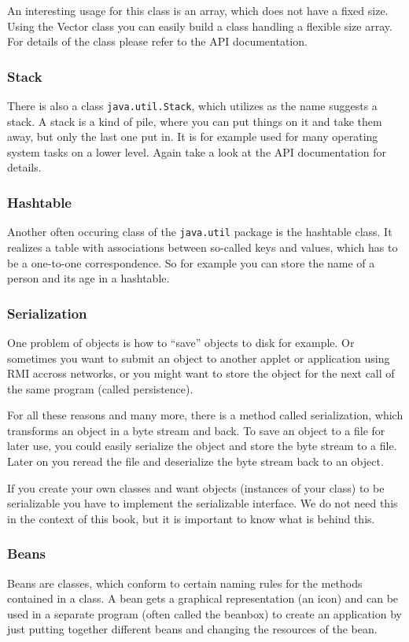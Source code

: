 An interesting usage for this class is an array, which does not have
a fixed size. Using the Vector class you can easily build a class
handling a flexible size array. For details of the class please
refer to the API documentation.

\subsubsection{Stack}
There is also a class \verb|java.util.Stack|, which utilizes as the
name suggests a stack. A stack is a kind of pile, where you can put
things on it and take them away, but only the last one put in. It is
for example used for many operating system tasks on a lower level.
Again take a look at the API documentation for details.

\subsubsection{Hashtable}
Another often occuring class of the \verb|java.util| package is the
hashtable class. It realizes a table with associations between so-called
keys and values, which has to be a one-to-one correspondence. So for
example you can store the name of a person and its age in a hashtable.


\subsubsection{Serialization}
One problem of objects is how to ``save'' objects to disk for example.
Or sometimes you want to submit an object to another applet or
application using RMI accross networks, or you might want to
store the object for the next call of the same program (called 
persistence). 

For all
these reasons and many more, there is a method called serialization,
which transforms an object in a byte stream and back. 
To save an object to a file for later use, you could easily serialize
the object and store the byte stream to a file. Later on you reread
the file and deserialize the byte stream back to an object. 

If you create your own classes and want objects (instances of your 
class) to be serializable you have to implement the serializable interface.
We do not need this in the context of this book, but it is
important to know what is behind this.  

\subsubsection{Beans}
\label{sec:Beans}
Beans are classes, which conform to certain naming rules
for the methods contained in a class. A bean gets a graphical
representation (an icon) and can be used in a separate program
(often called the beanbox) to create an application by just
putting together different beans and changing the resources
of the bean. 

